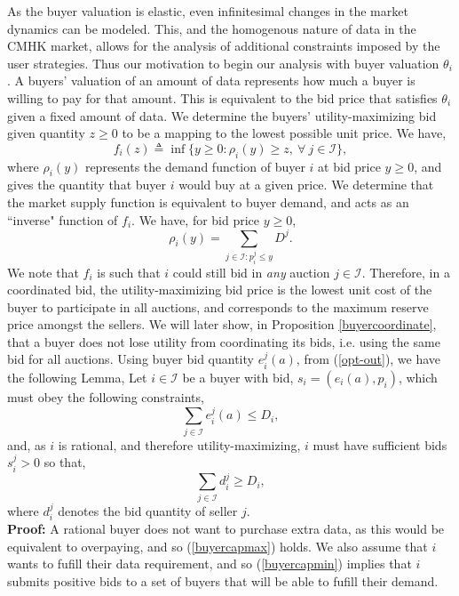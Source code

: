 \documentclass[12pt]{article}
\theoremstyle{definition}
\newcommand{\mcI}{\mathcal{I}}
\begin{document}
\begin{multicols}{2}
As the buyer valuation is elastic, even infinitesimal changes in the market dynamics can be
modeled. This, and the homogenous nature of data in the CMHK market, 
allows for the analysis of additional constraints imposed by the user
strategies. Thus our motivation to begin our analysis with buyer valuation $\theta_i$.
A buyers' valuation of an amount of data represents how much a buyer is willing
to pay for that amount. 
This is equivalent to the bid price that
satisfies $\theta_i$ given a fixed amount of data. We determine the
buyers' utility-maximizing bid given quantity $z\ge0$ to be a mapping to the lowest
possible unit price. We have,
\begin{equation}\label{buyerinversedemand}
    f_i(z) \triangleq \inf\big\lbrace y\ge 0:
        \rho_i(y) \ge z, \ \forall \ j \in \mcI\big\rbrace,
\end{equation}
where $\rho_i(y)$ represents the demand function of buyer $i$ at bid price
$y\ge 0$, and gives the quantity that buyer $i$ would buy at a given price.
We determine that the market supply function is equivalent to buyer demand, and 
acts as an ``inverse" function of $f_i$. We have, for bid price $y\ge 0$,
\begin{equation}\label{datasupply}
    \rho_i(y) = \sum_{j\in\mcI : p_i^j\le y} D^j.
\end{equation}
We note that $f_i$ is such that
$i$ could still bid in \emph{any} auction $j\in\mcI$.
Therefore, in a coordinated bid, the utility-maximizing bid price is the
lowest unit cost of the buyer to participate in all auctions, and corresponds to
the maximum reserve price amongst the sellers. We will later show, in Proposition
\ref{buyercoordinate}, that a buyer does not lose utility from coordinating its
bids, i.e. using the same bid for all auctions.
Using buyer bid quantity $e_i^j(a)$, from (\ref{opt-out}), 
we have the following Lemma,
{
\label{buyerconstraints}
Let $i\in\mcI$ be a buyer with bid, $s_i = (e_i(a), p_i)$, which must obey
the following constraints,
\begin{equation}\label{buyercapmax}
    \sum_{j\in\mcI} e^j_i(a) \le D_i,
\end{equation}
and, as $i$ is rational, and therefore utility-maximizing, $i$ must have
sufficient bids $s_i^j > 0$ so that,
\begin{equation}\label{buyercapmin}
    \sum_{j\in\mcI} d^j_i \ge D_i,
\end{equation}
where $d_i^j$ denotes the bid quantity of seller $j$.
}\\
\textbf{Proof:}
A rational buyer does not want to purchase extra data, as this would be
equivalent to overpaying, and so (\ref{buyercapmax}) holds. We also assume that
$i$ wants to fufill their data requirement, and so (\ref{buyercapmin}) implies
that $i$ submits positive bids to a set of buyers that will be able to fufill
their demand.


\end{multicols}
\end{document}

